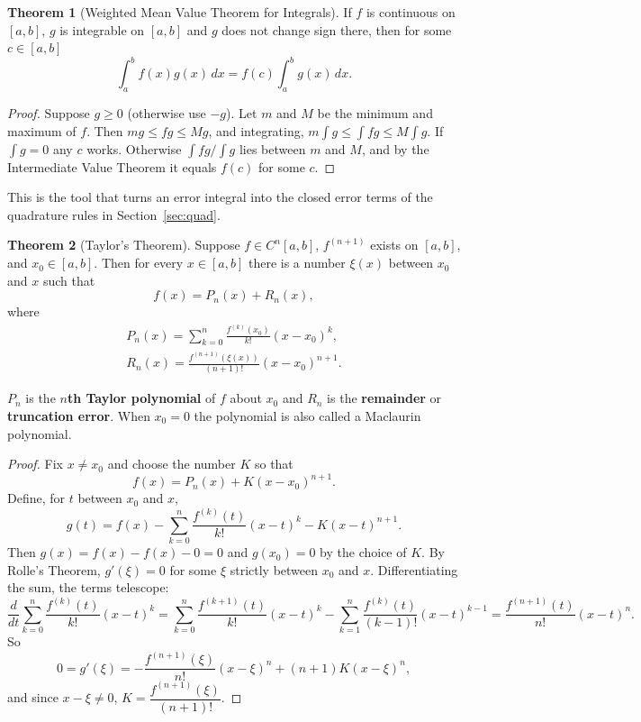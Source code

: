 \documentclass[11pt,a4paper]{article}
\numberwithin{equation}{section}
\theoremstyle{definition}
\newtheorem{thm}{Theorem}[subsection]
\begin{document}
\begin{thm}[Weighted Mean Value Theorem for Integrals]
\label{thm:wmvt}
If $f$ is continuous on $[a,b]$, $g$ is integrable on $[a,b]$ and $g$ does not change sign there, then for some $c\in[a,b]$
$$\int_a^b f(x)g(x)\,dx = f(c)\int_a^bg(x)\,dx .$$
\end{thm}

\begin{proof}
Suppose $g\geq0$ (otherwise use $-g$). Let $m$ and $M$ be the minimum and maximum of $f$. Then $mg\leq fg\leq Mg$, and integrating,
$m\int g\leq\int fg\leq M\int g$. If $\int g = 0$ any $c$ works. Otherwise $\int fg/\int g$ lies between $m$ and $M$, and by the
Intermediate Value Theorem it equals $f(c)$ for some $c$.
\end{proof}

This is the tool that turns an error integral into the closed error terms of the quadrature rules in Section~\ref{sec:quad}.

\begin{thm}[Taylor's Theorem]
\label{thm:taylor}
Suppose $f\in C^n[a,b]$, $f^{(n+1)}$ exists on $[a,b]$, and $x_0\in[a,b]$. Then for every $x\in[a,b]$ there is a number $\xi(x)$ between
$x_0$ and $x$ such that
$$f(x) = P_n(x) + R_n(x),$$
where
\begin{gather*}
P_n(x) = \sum_{k=0}^n\frac{f^{(k)}(x_0)}{k!}(x-x_0)^k ,\\
R_n(x) = \frac{f^{(n+1)}(\xi(x))}{(n+1)!}(x-x_0)^{n+1}.
\end{gather*}
\end{thm}

$P_n$ is the \textbf{$n$th Taylor polynomial} of $f$ about $x_0$ and $R_n$ is the \textbf{remainder} or \textbf{truncation error}. When
$x_0 = 0$ the polynomial is also called a Maclaurin polynomial.

\begin{proof}
Fix $x\neq x_0$ and choose the number $K$ so that
$$f(x) = P_n(x) + K(x-x_0)^{n+1}.$$
Define, for $t$ between $x_0$ and $x$,
$$g(t) = f(x) - \sum_{k=0}^n\frac{f^{(k)}(t)}{k!}(x-t)^k - K(x-t)^{n+1}.$$
Then $g(x) = f(x) - f(x) - 0 = 0$ and $g(x_0) = 0$ by the choice of $K$. By Rolle's Theorem, $g'(\xi) = 0$ for some $\xi$ strictly between
$x_0$ and $x$. Differentiating the sum, the terms telescope:
$$\frac{d}{dt}\sum_{k=0}^n\frac{f^{(k)}(t)}{k!}(x-t)^k = \sum_{k=0}^n\frac{f^{(k+1)}(t)}{k!}(x-t)^k - \sum_{k=1}^n\frac{f^{(k)}(t)}{(k-1)!}(x-t)^{k-1} = \frac{f^{(n+1)}(t)}{n!}(x-t)^n .$$
So
$$0 = g'(\xi) = -\frac{f^{(n+1)}(\xi)}{n!}(x-\xi)^n + (n+1)K(x-\xi)^n ,$$
and since $x-\xi\neq0$, $K = \dfrac{f^{(n+1)}(\xi)}{(n+1)!}$.
\end{proof}
\end{document}
